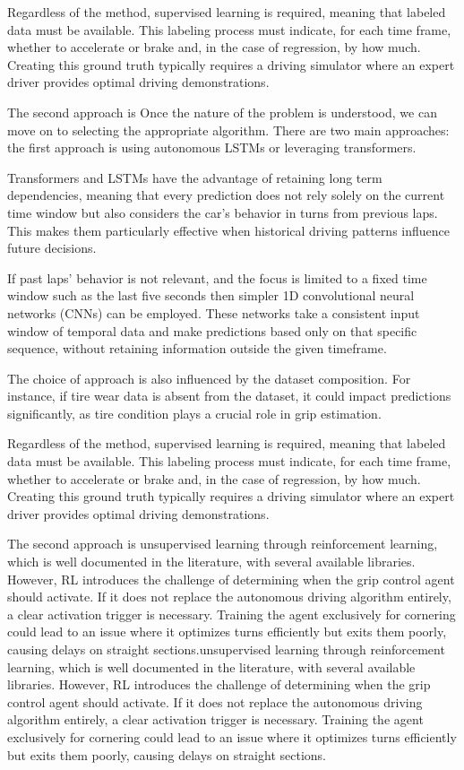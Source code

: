 \documentclass[a4paper,final,12pt]{report}
\begin{document}
Regardless of the method, supervised learning is required, meaning that labeled data must be available. This labeling process must indicate, for each time frame, whether to accelerate or brake and, in the case of regression, by how much. Creating this ground truth typically requires a driving simulator where an expert driver provides optimal driving demonstrations.

The second approach is Once the nature of the problem is understood, we can move on to selecting the appropriate algorithm. There are two main approaches: the first approach is using autonomous LSTMs or leveraging transformers. 

Transformers and LSTMs have the advantage of retaining long term dependencies, meaning that every prediction does not rely solely on the current time window but also considers the car's behavior in turns from previous laps. This makes them particularly effective when historical driving patterns influence future decisions.

If past laps' behavior is not relevant, and the focus is limited to a fixed time window such as the last five seconds then simpler 1D convolutional neural networks (CNNs) can be employed. These networks take a consistent input window of temporal data and make predictions based only on that specific sequence, without retaining information outside the given timeframe.

The choice of approach is also influenced by the dataset composition. For instance, if tire wear data is absent from the dataset, it could impact predictions significantly, as tire condition plays a crucial role in grip estimation.

Regardless of the method, supervised learning is required, meaning that labeled data must be available. This labeling process must indicate, for each time frame, whether to accelerate or brake and, in the case of regression, by how much. Creating this ground truth typically requires a driving simulator where an expert driver provides optimal driving demonstrations.

The second approach is unsupervised learning through reinforcement learning, which is well documented in the literature, with several available libraries. However, RL introduces the challenge of determining when the grip control agent should activate. If it does not replace the autonomous driving algorithm entirely, a clear activation trigger is necessary. Training the agent exclusively for cornering could lead to an issue where it optimizes turns efficiently but exits them poorly, causing delays on straight sections.unsupervised learning through reinforcement learning, which is well documented in the literature, with several available libraries. However, RL introduces the challenge of determining when the grip control agent should activate. If it does not replace the autonomous driving algorithm entirely, a clear activation trigger is necessary. Training the agent exclusively for cornering could lead to an issue where it optimizes turns efficiently but exits them poorly, causing delays on straight sections.
\end{document}
